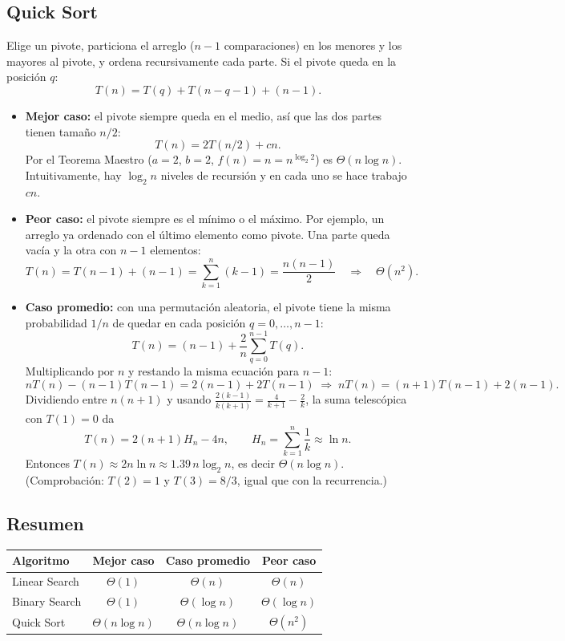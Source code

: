 \documentclass[11pt]{article}
\begin{document}
\subsection*{Quick Sort}
Elige un pivote, particiona el arreglo ($n-1$ comparaciones) en los menores y los mayores al pivote, y ordena recursivamente cada parte. Si el pivote queda en la posición $q$:
\[
T(n) = T(q) + T(n-q-1) + (n-1).
\]
\begin{itemize}
  \item \textbf{Mejor caso:} el pivote siempre queda en el medio, así que las dos partes tienen tamaño $n/2$:
  \[
  T(n) = 2T(n/2) + cn.
  \]
  Por el Teorema Maestro ($a = 2$, $b = 2$, $f(n) = n = n^{\log_2 2}$) es $\Theta(n\log n)$. Intuitivamente, hay $\log_2 n$ niveles de recursión y en cada uno se hace trabajo $cn$.

  \item \textbf{Peor caso:} el pivote siempre es el mínimo o el máximo. Por ejemplo, un arreglo ya ordenado con el último elemento como pivote. Una parte queda vacía y la otra con $n-1$ elementos:
  \[
  T(n) = T(n-1) + (n-1) = \sum_{k=1}^{n}(k-1) = \frac{n(n-1)}{2} \quad\Rightarrow\quad \Theta(n^2).
  \]

  \item \textbf{Caso promedio:} con una permutación aleatoria, el pivote tiene la misma probabilidad $1/n$ de quedar en cada posición $q = 0, \dots, n-1$:
  \[
  T(n) = (n-1) + \frac{2}{n}\sum_{q=0}^{n-1} T(q).
  \]
  Multiplicando por $n$ y restando la misma ecuación para $n-1$:
  \[
  nT(n) - (n-1)T(n-1) = 2(n-1) + 2T(n-1) \;\Rightarrow\; nT(n) = (n+1)T(n-1) + 2(n-1).
  \]
  Dividiendo entre $n(n+1)$ y usando $\frac{2(k-1)}{k(k+1)} = \frac{4}{k+1} - \frac{2}{k}$, la suma telescópica con $T(1) = 0$ da
  \[
  T(n) = 2(n+1)H_n - 4n, \qquad H_n = \sum_{k=1}^{n}\frac{1}{k} \approx \ln n.
  \]
  Entonces $T(n) \approx 2n\ln n \approx 1.39\, n\log_2 n$, es decir $\Theta(n\log n)$. (Comprobación: $T(2) = 1$ y $T(3) = 8/3$, igual que con la recurrencia.)
\end{itemize}

\subsection*{Resumen}
\begin{center}
\begin{tabular}{lccc}
\toprule
Algoritmo & Mejor caso & Caso promedio & Peor caso \\
\midrule
Linear Search & $\Theta(1)$ & $\Theta(n)$ & $\Theta(n)$ \\
Binary Search & $\Theta(1)$ & $\Theta(\log n)$ & $\Theta(\log n)$ \\
Quick Sort    & $\Theta(n\log n)$ & $\Theta(n\log n)$ & $\Theta(n^2)$ \\
\bottomrule
\end{tabular}
\end{center}
\end{document}
